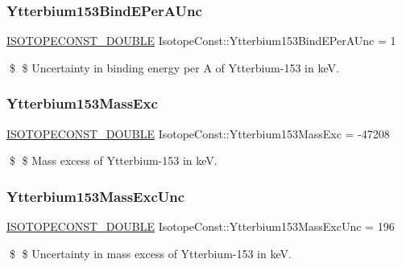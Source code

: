 \subsubsection{\texorpdfstring{Ytterbium153\+Bind\+E\+Per\+A\+Unc}{Ytterbium153BindEPerAUnc}}
{\footnotesize\ttfamily \mbox{\hyperlink{group___isotope_const-_macros_ga8f45a7272ce02c0b4c65c44636ed719a}{I\+S\+O\+T\+O\+P\+E\+C\+O\+N\+S\+T\+\_\+\+D\+O\+U\+B\+LE}} Isotope\+Const\+::\+Ytterbium153\+Bind\+E\+Per\+A\+Unc = 1}

\$ \$ Uncertainty in binding energy per A of Ytterbium-\/153 in keV. \mbox{\label{group___isotope_const-_ytterbium-_yb153_ga103284dee0544ffceca4ef93b45bcc4b}} 
\subsubsection{\texorpdfstring{Ytterbium153\+Mass\+Exc}{Ytterbium153MassExc}}
{\footnotesize\ttfamily \mbox{\hyperlink{group___isotope_const-_macros_ga8f45a7272ce02c0b4c65c44636ed719a}{I\+S\+O\+T\+O\+P\+E\+C\+O\+N\+S\+T\+\_\+\+D\+O\+U\+B\+LE}} Isotope\+Const\+::\+Ytterbium153\+Mass\+Exc = -\/47208}

\$ \$ Mass excess of Ytterbium-\/153 in keV. \mbox{\label{group___isotope_const-_ytterbium-_yb153_gabf0ab06ec4cd47f1843e01db366bfe90}} 
\subsubsection{\texorpdfstring{Ytterbium153\+Mass\+Exc\+Unc}{Ytterbium153MassExcUnc}}
{\footnotesize\ttfamily \mbox{\hyperlink{group___isotope_const-_macros_ga8f45a7272ce02c0b4c65c44636ed719a}{I\+S\+O\+T\+O\+P\+E\+C\+O\+N\+S\+T\+\_\+\+D\+O\+U\+B\+LE}} Isotope\+Const\+::\+Ytterbium153\+Mass\+Exc\+Unc = 196}

\$ \$ Uncertainty in mass excess of Ytterbium-\/153 in keV. \mbox{\label{group___isotope_const-_ytterbium-_yb153_ga4d6a3eeea4799299f5404d9f3720a98d}} 
